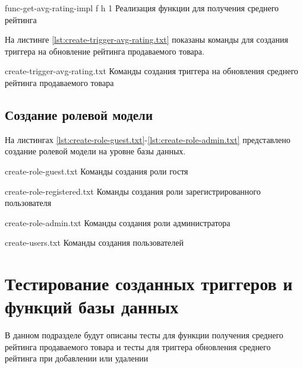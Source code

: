{func-get-avg-rating-impl} %
{f} %
{h} %
{1\textwidth} %
{Реализация функции для получения среднего рейтинга} %

На листинге \ref{lst:create-trigger-avg-rating.txt} показаны команды для создания триггера на обновление рейтинга продаваемого товара.

{create-trigger-avg-rating.txt} %
{Команды создания триггера на обновления среднего рейтинга продаваемого товара} %

\clearpage

\subsection{Создание ролевой модели}

На листингах \ref{lst:create-role-guest.txt}-\ref{lst:create-role-admin.txt} представлено создание ролевой модели на уровне базы данных.

{create-role-guest.txt} %
{Команды создания роли гостя} %

{create-role-registered.txt} %
{Команды создания роли зарегистрированного пользователя} %

{create-role-admin.txt} %
{Команды создания роли администратора} %

{create-users.txt} %
{Команды создания пользователей} %

\clearpage

\section{Тестирование созданных триггеров и функций базы данных}

В данном подразделе будут описаны тесты для функции получения среднего рейтинга продаваемого товара и тесты для триггера обновления среднего рейтинга при добавлении или удалении 


